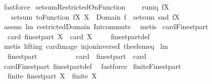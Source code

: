 \begin{isabellebody}
\ fastforce%
\endisatagproof
{\isafoldproof}%
%
\isadelimproof
\isanewline
%
\endisadelimproof
\isanewline
{}\isamarkupfalse%
\ setsumRestrictedOnFunction{\isacharcolon}\ \isanewline
\ \ \ {\isachardoublequoteopen}runiq\ {\isacharparenleft}f{\isacharbar}{\isacharbar}X{\isacharparenright}{\isachardoublequoteclose}\ \isanewline
\ \ \ {\isachardoublequoteopen}setsum\ {\isacharparenleft}toFunction\ {\isacharparenleft}f{\isacharbar}{\isacharbar}X{\isacharparenright}{\isacharparenright}\ {\isacharparenleft}X\ {\isasyminter}\ Domain\ f{\isacharparenright}\ {\isacharequal}\ setsum\ snd\ {\isacharparenleft}f{\isacharbar}{\isacharbar}X{\isacharparenright}{\isachardoublequoteclose}\ \isanewline
%
\isadelimproof
\ \ %
\endisadelimproof
%
\isatagproof
{}\isamarkupfalse%
\ assms\ lm{}{}{}\ restrictedDomain\ Int{\isacharunderscore}commute\ \isamarkupfalse%
\ metis%
\endisatagproof
{\isafoldproof}%
%
\isadelimproof
\isanewline
%
\endisadelimproof
\isanewline
{}\isamarkupfalse%
\ cardFinestpart{\isacharcolon}\ \isanewline
\ \ {\isachardoublequoteopen}card\ {\isacharparenleft}finestpart\ X{\isacharparenright}\ {\isacharequal}\ card\ X{\isachardoublequoteclose}\ \isanewline
%
\isadelimproof
\ \ %
\endisadelimproof
%
\isatagproof
{}\isamarkupfalse%
\ finestpart{\isacharunderscore}def\ \isamarkupfalse%
\ {\isacharparenleft}metis\ {\isacharparenleft}lifting{\isacharparenright}\ card{\isacharunderscore}image\ inj{\isacharunderscore}on{\isacharunderscore}inverseI\ the{\isacharunderscore}elem{\isacharunderscore}eq{\isacharparenright}%
\endisatagproof
{\isafoldproof}%
%
\isadelimproof
\isanewline
%
\endisadelimproof
\isanewline
{}\isamarkupfalse%
\ lm{}{}{}{\isacharcolon}\ \isanewline
\ \ {\isachardoublequoteopen}finestpart\ {\isacharbraceleft}{\isacharbraceright}\ {\isacharequal}\ {\isacharbraceleft}{\isacharbraceright}\ \ \ \ {\isacharampersand}\ \ \ \ card\ {\isasymcirc}\ finestpart\ {\isacharequal}\ card{\isachardoublequoteclose}\ \isanewline
%
\isadelimproof
\ \ %
\endisadelimproof
%
\isatagproof
{}\isamarkupfalse%
\ cardFinestpart\ finestpart{\isacharunderscore}def\ \isamarkupfalse%
\ fastforce%
\endisatagproof
{\isafoldproof}%
%
\isadelimproof
\isanewline
%
\endisadelimproof
\isanewline
{}\isamarkupfalse%
\ finiteFinestpart{\isacharcolon}\ \isanewline
\ \ {\isachardoublequoteopen}finite\ {\isacharparenleft}finestpart\ X{\isacharparenright}\ {\isacharequal}\ finite\ X{\isachardoublequoteclose}\ \isanewline

\end{isabellebody}
